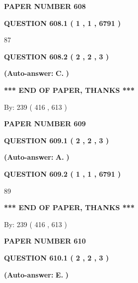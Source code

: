 \documentclass[12pt]{article}
\begin{document}
   
\newpage 
\setcounter{page}{ 
   608001 } 
   
   
 {\textbf{ \Large{ PAPER NUMBER  608  }}}
   
   
   
   
  
  
{\textbf{\large{QUESTION
608.1 
 ( 1 , 1 , 6791 )
}}}

87
  
  
{\textbf{\large{QUESTION
608.2 
 ( 2 , 2 , 3 )
}}}
 
 
{\textbf{(Auto-answer:}}
{\textbf{\large{
C.}}}
{\textbf{)}}
 
 
   
   
   
   
\vspace{1.0in} 
{\textbf{\large{ *** END OF PAPER, THANKS *** }}} 
   
   
\hspace{1.0in} By: 
 239 ( 416 ,  613 )
   
   
   
   
\newpage 
\setcounter{page}{ 
   609001 } 
   
   
 {\textbf{ \Large{ PAPER NUMBER  609  }}}
   
   
   
   
  
  
{\textbf{\large{QUESTION
609.1 
 ( 2 , 2 , 3 )
}}}
 
 
{\textbf{(Auto-answer:}}
{\textbf{\large{
A.}}}
{\textbf{)}}
 
 
  
  
{\textbf{\large{QUESTION
609.2 
 ( 1 , 1 , 6791 )
}}}

89
   
   
   
   
\vspace{1.0in} 
{\textbf{\large{ *** END OF PAPER, THANKS *** }}} 
   
   
\hspace{1.0in} By: 
 239 ( 416 ,  613 )
   
   
   
   
\newpage 
\setcounter{page}{ 
   610001 } 
   
   
 {\textbf{ \Large{ PAPER NUMBER  610  }}}
   
   
   
   
  
  
{\textbf{\large{QUESTION
610.1 
 ( 2 , 2 , 3 )
}}}
 
 
{\textbf{(Auto-answer:}}
{\textbf{\large{
E.}}}
{\textbf{)}}
 
 
  
\end{document}
